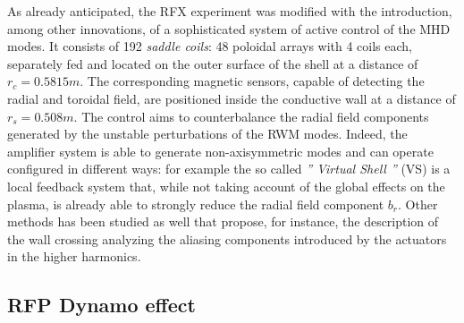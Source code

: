 As already anticipated, the RFX experiment was modified with the introduction, among other innovations, of a sophisticated system of active control of the MHD modes. It consists of 192 \textit{saddle coils}: 48 poloidal arrays with 4 coils each, separately fed and located on the outer surface of the shell at a distance of $r_c = 0.5815m$. The corresponding magnetic sensors, capable of detecting the radial and toroidal field, are positioned inside the conductive wall at a distance of $r_s = 0.508m$. The control aims to counterbalance the radial field components generated by the unstable perturbations of the RWM modes. Indeed, the amplifier system is able to generate non-axisymmetric modes and can operate configured in different ways: for example the so called \emph{'' Virtual Shell ''} (VS) is a local feedback system that, while not taking account of the global effects on the plasma, is already able to strongly reduce the radial field component $b_r$\cite{pizz78}\cite{pizz79}. Other methods has been studied as well that propose, for instance, the description of the wall crossing analyzing the aliasing components introduced by the actuators in the higher harmonics\cite{pizz81}.




\subsection{RFP Dynamo effect}


